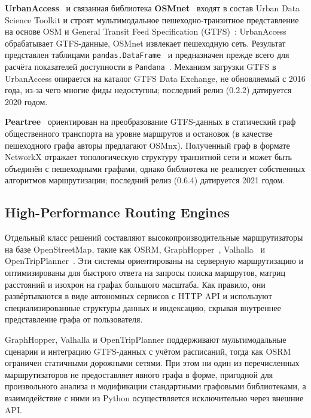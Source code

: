 \documentclass[sigconf,nonacm]{acmart}
\begin{document}
    \textbf{UrbanAccess}~\cite{blanchard2017urbanaccess} и связанная библиотека \textbf{OSMnet}~\cite{osmnet_github}
    входят в состав Urban Data Science Toolkit и строят мультимодальное пешеходно-транзитное представление на основе OSM и
    General Transit Feed Specification (GTFS)~\cite{gtfs_spec}: UrbanAccess обрабатывает GTFS-данные, OSMnet извлекает пешеходную сеть.
    Результат представлен таблицами \texttt{pandas.DataFrame}~\cite{mckinney2010pandas} и предназначен прежде всего для расчёта
    показателей доступности в \texttt{Pandana}~\cite{foti2014pandana}.
    Механизм загрузки GTFS в UrbanAccess опирается на каталог GTFS Data Exchange, не обновляемый с 2016 года,
    из-за чего многие фиды недоступны; последний релиз (0.2.2) датируется 2020 годом.

    \textbf{Peartree}~\cite{peartree_github} ориентирован на преобразование GTFS-данных в статический граф общественного
    транспорта на уровне маршрутов и остановок (в качестве пешеходного графа авторы предлагают OSMnx).
    Полученный граф в формате NetworkX отражает топологическую структуру транзитной сети и может быть объединён с пешеходными
    графами, однако библиотека не реализует собственных алгоритмов маршрутизации; последний релиз (0.6.4) датируется 2021 годом.

    \subsection{High-Performance Routing Engines}
    \label{subsec:high-performance-routing-engines}

    Отдельный класс решений составляют высокопроизводительные маршрутизаторы на базе OpenStreetMap,
    такие как OSRM\cite{osrm}, GraphHopper~\cite{graphhopper}, Valhalla~\cite{valhalla} и OpenTripPlanner~\cite{otp}.
    Эти системы ориентированы на серверную маршрутизацию и оптимизированы для быстрого ответа на запросы поиска маршрутов,
    матриц расстояний и изохрон на графах большого масштаба.
    Как правило, они развёртываются в виде автономных сервисов
    с HTTP API и используют специализированные структуры данных и индексацию, скрывая внутреннее представление графа от
    пользователя.

    GraphHopper, Valhalla и OpenTripPlanner поддерживают мультимодальные сценарии и интеграцию GTFS-данных с
    учётом расписаний, тогда как OSRM ограничен статичными дорожными сетями.
    При этом ни один из перечисленных маршрутизаторов не предоставляет явного графа в форме, пригодной для произвольного
    анализа и модификации стандартными графовыми библиотеками, а взаимодействие с ними из Python осуществляется
    исключительно через внешние API\@.
\end{document}
